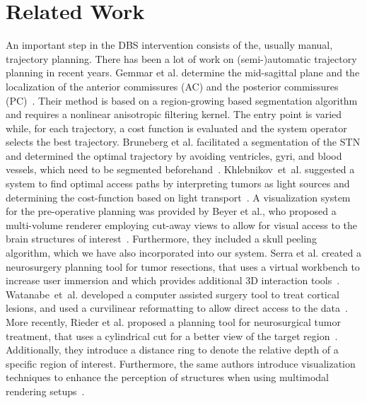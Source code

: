 \documentclass{vgtc}                          %
\begin{document}
\section{Related Work}\label{sec:related}
An important step in the DBS intervention consists of the, usually manual, trajectory planning. There has been a lot of work on (semi-)automatic trajectory planning in recent years. Gemmar et al. determine the mid-sagittal plane and the localization of the anterior commissures (AC) and the posterior commissures (PC)~\cite{Gemmar2008}. Their method is based on a region-growing based segmentation algorithm and requires a nonlinear anisotropic filtering kernel. The entry point is varied while, for each trajectory, a cost function is evaluated and the system operator selects the best trajectory. Bruneberg et al. facilitated a segmentation of the STN and determined the optimal trajectory by avoiding ventricles, gyri, and blood vessels, which need to be segmented beforehand~\cite{Brunenberg2007}. Khlebnikov~et~al. suggested a system to find optimal access paths by interpreting tumors as light sources and determining the cost-function based on light transport~\cite{Khlebnikov2011}. A visualization system for the pre-operative planning was provided by Beyer et al., who proposed a multi-volume renderer employing cut-away views to allow for visual access to the brain structures of interest~\cite{Beyer2007}. Furthermore, they included a skull peeling algorithm, which we have also incorporated into our system. Serra et al. created a neurosurgery planning tool for tumor resections, that uses a virtual workbench to increase user immersion and which provides additional 3D interaction tools~\cite{Serra1998}. Watanabe~et~al. developed a computer assisted surgery tool to treat cortical lesions, and used a curvilinear reformatting to allow direct access to the data~\cite{Watanabe}.  More recently, Rieder et al. proposed a planning tool for neurosurgical tumor treatment, that uses a cylindrical cut for a better view of the target region~\cite{Rieder2008}. Additionally, they introduce a distance ring to denote the relative depth of a specific region of interest. Furthermore, the same authors introduce visualization techniques to enhance the perception of structures when using multimodal rendering setups~\cite{Rieder2008a}.
\end{document}
